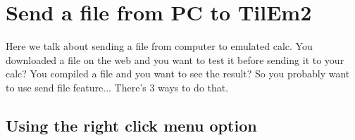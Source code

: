 \documentclass[10pt]{report}
\begin{document}
\section{Send a file from PC to TilEm2}

Here we talk about sending a file from computer to emulated calc.\newline
You downloaded a file on the web and you want to test it before sending it to your calc?\newline
You compiled a file and you want to see the result?\newline
So you probably want to use send file feature...\newline\newline
There's 3 ways to do that.\newline

\subsection{Using the right click menu option}
\end{document}
